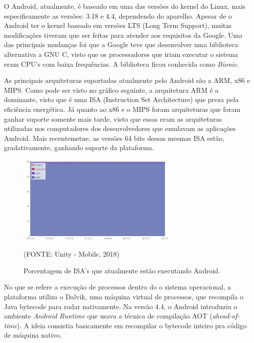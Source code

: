 \documentclass[
    12pt,       %
    openright,      %
    twoside,      %
    a4paper,      %
    english,      %
    french,       %
    spanish,      %
    brazil,       %
    ]{abntex2}
\begin{document}
        O Android, atualmente, é baseado em uma das versões do kernel do Linux, mais especificamente
        as versões: 3.18 e 4.4, dependendo do aparelho. Apesar de o Android ter o kernel baseado
        em versões LTS (Long Term Support), muitas modificações tiveram que ser feitas para atender
        aos requisitos da Google. Uma das principais mudanças foi que a Google teve que desenvolver
        uma biblioteca alternativa a GNU C, visto que os processadores que iriam executar o sistema
        eram CPU's com baixa frequências. A biblioteca ficou conhecida como \textit{Bionic}.

        As principais arquiteturas suportadas atualmente pelo Android são a ARM, x86 e MIPS. Como
        pode ser visto no gráfico seguinte, a arquitetura ARM é a dominante, visto que é uma ISA
        (Instruction Set Architecture) que preza pela eficiência energética. Já quanto ao x86 e
        o MIPS foram arquiteturas que foram ganhar suporte somente mais tarde, visto que essas eram
        as arquiteturas utilizadas nos computadores dos desenvolvedores que emulavam as aplicações
        Android. Mais recentemetne, as versões 64 bits dessas mesmas ISA estão, gradativamente,
        ganhando suporte da plataforma.

        \begin{figure}[htbp]
            \begin{center}
                \includegraphics[width=0.7\textwidth]{img/cpusPercentage.png}
            \end{center}
        \caption{\label{fig:passaro}Porcentagem de ISA's que atualmente estão executando Android.}
        \begin{center}(FONTE: Unity - Mobile, 2018)\end{center}
        \end{figure}

        No que se refere a execução de processos dentro do o sistema operacional, a plataforma
        utiliza o Dalvik, uma máquina virtual de processos, que recompila o Java bytecode para
        rodar nativamente. Na versão 4.4, o Android introduziu o ambiente \textit{Android Runtime}
        que usava a técnica de compilação AOT (\textit{ahead-of-time}). A ideia consistia
        basicamente em recompilar o bytecode inteiro pra código de máquina nativo.
\end{document}
